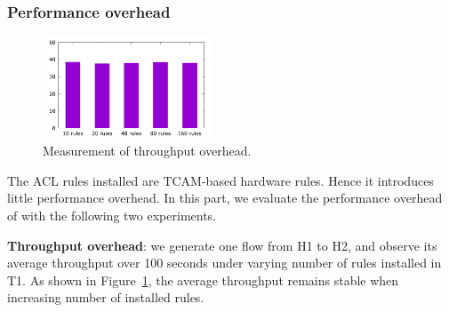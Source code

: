 \subsubsection{Performance overhead}\label{subsec:exp_performanceoverhead}

\begin{figure}
	\centering
	\includegraphics[width=0.45\textwidth] {figs/overhead_avgthrpt}
	\caption{Measurement of throughput overhead.}\label{fig:thrpt_overhead}
\end{figure}



\begin{table}[t]
	\centering
	\caption{Measurement of latency overhead.}
	\label{table:latency_overhead}
\end{table}


The ACL rules \sysname{} installed are TCAM-based hardware rules. Hence it introduces little performance overhead. In this part, we evaluate the performance overhead of \sysname{} with the following two experiments.
 
 \textbf{Throughput overhead}: we generate one flow from H1 to H2, and observe its average throughput over 100 seconds under varying number of \sysname{} rules installed in T1. As shown in Figure~\ref{fig:thrpt_overhead}, the average throughput remains stable when increasing number of installed rules.

